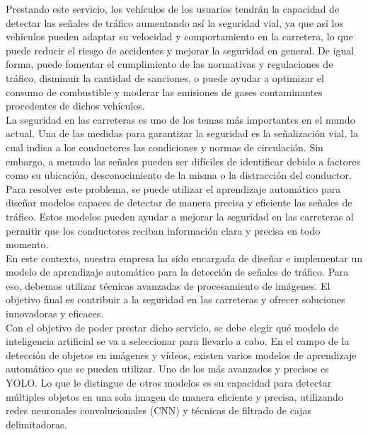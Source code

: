 Prestando este servicio, los vehículos de los usuarios tendrán la capacidad de detectar las señales de tráfico aumentando así la seguridad vial, ya que así los vehículos pueden adaptar su velocidad y comportamiento en la carretera, lo que puede reducir el riesgo de accidentes y mejorar la seguridad en general. De igual forma, puede fomentar el cumplimiento de las normativas y regulaciones de tráfico, disminuir la cantidad de sanciones, o puede ayudar a optimizar el consumo de combustible y moderar las emisiones de gases contaminantes procedentes de dichos vehículos.\\

La seguridad en las carreteras es uno de los temas más importantes en el mundo actual. Una de las medidas para garantizar la seguridad es la señalización vial, la cual indica a los conductores las condiciones y normas de circulación. Sin embargo, a menudo las señales pueden ser difíciles de identificar debido a factores como su ubicación, desconocimiento de la misma o la distracción del conductor.\\

Para resolver este problema, se puede utilizar el aprendizaje automático para diseñar modelos capaces de detectar de manera precisa y eficiente las señales de tráfico. Estos modelos pueden ayudar a mejorar la seguridad en las carreteras al permitir que los conductores reciban información clara y precisa en todo momento.\\

En este contexto, nuestra empresa ha sido encargada de diseñar e implementar un modelo de aprendizaje automático para la detección de señales de tráfico. Para eso, debemos utilizar técnicas avanzadas de procesamiento de imágenes. El objetivo final es contribuir a la seguridad en las carreteras y ofrecer soluciones innovadoras y eficaces.\\

Con el objetivo de poder prestar dicho servicio, se debe elegir qué modelo de inteligencia artificial se va a seleccionar para llevarlo a cabo. En el campo de la detección de objetos en imágenes y vídeos, existen varios modelos de aprendizaje automático que se pueden utilizar. Uno de los más avanzados y precisos es YOLO. Lo que le distingue de otros modelos es su capacidad para detectar múltiples objetos en una sola imagen de manera eficiente y precisa, utilizando redes neuronales convolucionales (CNN) y técnicas de filtrado de cajas delimitadoras. \\

